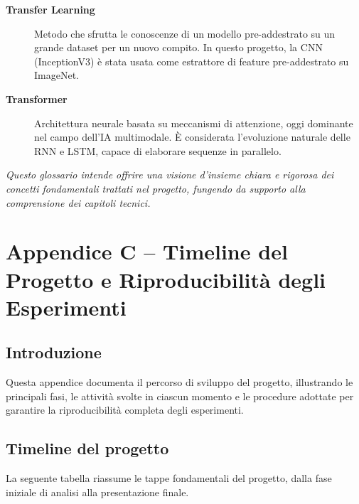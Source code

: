 \documentclass[11pt,a4paper]{report}
\begin{document}
\begin{description}
  \item[\textbf{Transfer Learning}]  
  Metodo che sfrutta le conoscenze di un modello pre-addestrato su un grande dataset per un nuovo compito.  
  In questo progetto, la CNN (InceptionV3) è stata usata come estrattore di feature pre-addestrato su ImageNet.

  \item[\textbf{Transformer}]  
  Architettura neurale basata su meccanismi di attenzione, oggi dominante nel campo dell’IA multimodale.  
  È considerata l’evoluzione naturale delle RNN e LSTM, capace di elaborare sequenze in parallelo.

\end{description}

\bigskip
\noindent
\textit{Questo glossario intende offrire una visione d’insieme chiara e rigorosa dei concetti fondamentali trattati nel progetto, fungendo da supporto alla comprensione dei capitoli tecnici.}


\chapter*{Appendice C – Timeline del Progetto e Riproducibilità degli Esperimenti}

\section*{Introduzione}

Questa appendice documenta il percorso di sviluppo del progetto, illustrando le principali fasi, le attività svolte in ciascun momento e le procedure adottate per garantire la riproducibilità completa degli esperimenti.

\section{Timeline del progetto}

La seguente tabella riassume le tappe fondamentali del progetto, dalla fase iniziale di analisi alla presentazione finale.
\end{document}
